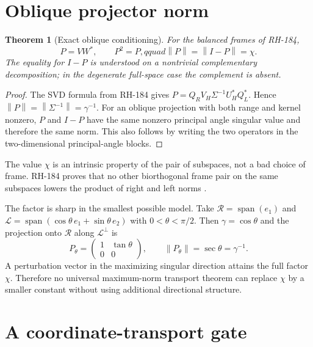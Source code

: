 \documentclass[12pt]{article}
\newtheorem{theorem}{Theorem}[section]
\theoremstyle{remark}
\newcommand{\norm}[1]{\left\lVert#1\right\rVert}
\newcommand{\cR}{\mathcal R}
\newcommand{\cL}{\mathcal L}
\begin{document}
\section{Oblique projector norm}

\begin{theorem}[Exact oblique conditioning]\label{thm:oblique-norm}
For the balanced frames of RH-184,
\begin{equation}\label{eq:p-norm}
 P=VW^*,\qquad P^2=P,qquad
 \norm P=\norm{I-P}=\chi.
\end{equation}
The equality for $I-P$ is understood on a nontrivial complementary
decomposition; in the degenerate full-space case the complement is absent.
\end{theorem}

\begin{proof}
The SVD formula from RH-184 gives
$P=Q_RV_H\Sigma^{-1}U_H^*Q_L^*$.  Hence
$\norm P=\norm{\Sigma^{-1}}=\gamma^{-1}$.  For an oblique projection with
both range and kernel nonzero, $P$ and $I-P$ have the same nonzero principal
angle singular value and therefore the same norm.  This also follows by
writing the two operators in the two-dimensional principal-angle blocks.
\end{proof}

The value $\chi$ is an intrinsic property of the pair of subspaces, not a
bad choice of frame.  RH-184 proves that no other biorthogonal frame pair on
the same subspaces lowers the product of right and left norms
\citep{WangRH184}.

The factor is sharp in the smallest possible model.  Take
$\cR=\operatorname{span}(e_1)$ and
$\cL=\operatorname{span}(\cos\theta\,e_1+\sin\theta\,e_2)$ with
$0<\theta<\pi/2$.  Then $\gamma=\cos\theta$ and the projection onto $\cR$
along $\cL^\perp$ is
\begin{equation}\label{eq:two-dimensional-projector}
 P_\theta=
 \begin{pmatrix}1&\tan\theta\\0&0\end{pmatrix},
 \qquad \norm{P_\theta}=\sec\theta=\gamma^{-1}.
\end{equation}
A perturbation vector in the maximizing singular direction attains the full
factor $\chi$.  Therefore no universal maximum-norm transport theorem can
replace $\chi$ by a smaller constant without using additional directional
structure.

\section{A coordinate-transport gate}
\end{document}

